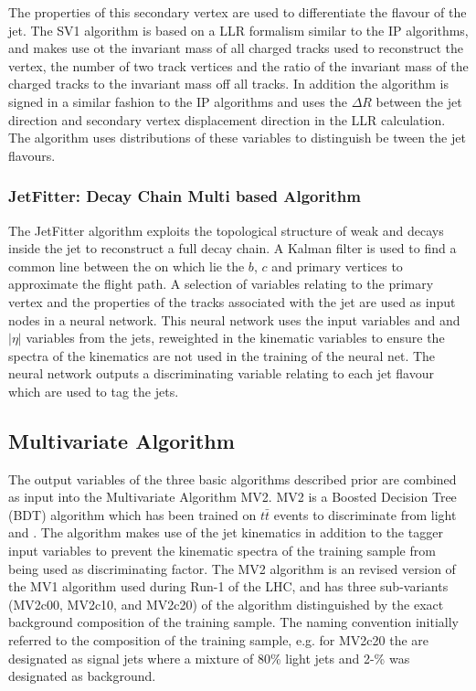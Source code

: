 		The properties of this secondary vertex are used to differentiate the flavour of the jet. The SV1 algorithm is based on a LLR formalism similar to the IP algorithms, and makes use ot the invariant mass of all charged tracks used to reconstruct the vertex, the number of two track vertices and the ratio of the invariant mass of the charged tracks to the invariant mass off all tracks. In addition the algorithm is signed in a similar fashion to the IP algorithms and uses the $\Delta R$ between the jet direction and secondary vertex displacement direction in the LLR calculation. The algorithm uses distributions of these variables to distinguish be      tween the jet flavours. \cite{btagOptimisation, bTagPerformance} 
		
	\subsubsection{JetFitter: Decay Chain Multi based Algorithm}
	\label{det:btag:jf}
	
		The JetFitter algorithm exploits the topological structure of weak \bhadron and \chadron decays inside the jet to reconstruct a full \bhadron decay chain. A Kalman filter  is used to find a common line between the on which lie the $b$, $c$ and primary vertices to approximate the \bhadron flight path. A selection of variables relating to the primary vertex and the properties of the tracks associated with the jet are used as input nodes in a neural network. This neural network uses the input variables and \pt and $|\eta|$ variables from the jets, reweighted in the kinematic variables to ensure the spectra of the kinematics are not used in the training of the neural net. The neural network outputs a discriminating variable relating to each jet flavour which are used to tag the jets. \cite{btagIdentification}
		
	\subsection{Multivariate Algorithm}
	\label{det:btag:mv}
	
	The output variables of the three basic algorithms described prior are combined as input into the Multivariate Algorithm MV2. MV2 is a Boosted Decision Tree (BDT) algorithm which has been trained on $t\bar{t}$ events to discriminate \bjets from light and \cjets. The algorithm makes use of the jet kinematics in addition to the tagger input variables to prevent the kinematic spectra of the training sample from being used as discriminating factor.  The MV2 algorithm is an revised version of the MV1 algorithm used during Run-1 of the LHC, and has three sub-variants (MV2c00, MV2c10, and MV2c20) of the algorithm distinguished by the exact background composition of the training sample. The naming convention initially referred to the \cjet composition of the training sample, e.g. for MV2c20 the \bjets are designated as signal jets where a mixture of 80\% light jets and 2-\% \cjets was designated as background. 
	
